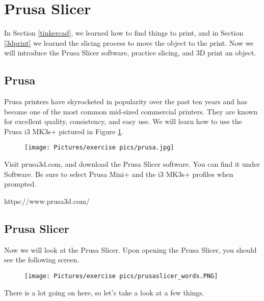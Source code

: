 
\section{Prusa Slicer}

In Section \ref{tinkercad}, we learned how to find things to print, and in Section \ref{3dprint} we learned the slicing process to move the object to the print. Now we will introduce the Prusa Slicer software, practice slicing, and 3D print an object.

\subsection{Prusa}

Prusa printers have skyrocketed in popularity over the past ten years and has become one of the most common mid-sized commercial printers. They are known for excellent quality, consistency, and easy use. We will learn how to use the Prusa i3 MK3s+ pictured in Figure \ref{fig:prusai3}.

\begin{figure}[h]
    \centering
    \texttt{[image: Pictures/exercise pics/prusa.jpg]}
    \label{fig:prusai3}
\end{figure}

\begin{exercise}
Visit prusa3d.com, and download the Prusa Slicer software. You can find it under Software. Be sure to select Prusa Mini+ and the i3 MK3s+ profiles when prompted.
\end{exercise}
{\footnotesize https://www.prusa3d.com/}

\subsection{Prusa Slicer}

Now we will look at the Prusa Slicer. Upon opening the Prusa Slicer, you should see the following screen.

\begin{figure}[h]
    \centering
    \texttt{[image: Pictures/exercise pics/prusaslicer\_words.PNG]}
    \label{fig:prusaslicer}
\end{figure}

\noindent There is a lot going on here, so let's take a look at a few things. 


